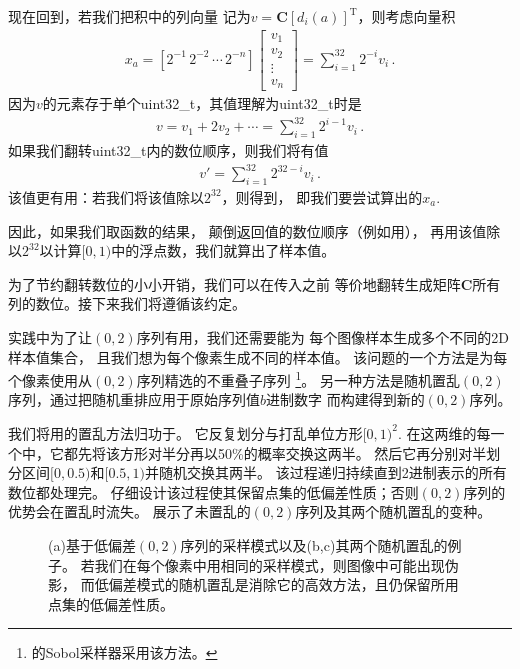 现在回到，若我们把积中的列向量
记为$v={\bm C}[d_i(a)]^{\mathrm{T}}$，则考虑向量积
\begin{align}\label{eq:7.11}
    x_a=[2^{-1}\, 2^{-2}\,\cdots\, 2^{-n}]\left[
        \begin{array}{c}
            v_1    \\
            v_2    \\
            \vdots \\
            v_n
        \end{array}
        \right]=\sum\limits_{i=1}^{32}{2^{-i}v_i}\, .
\end{align}
因为$v$的元素存于单个{\ttfamily uint32\_t}，其值理解为{\ttfamily uint32\_t}时是
\begin{align*}
    v=v_1+2v_2+\cdots=\sum\limits_{i=1}^{32}{2^{i-1}v_i}\, .
\end{align*}
如果我们翻转{\ttfamily uint32\_t}内的数位顺序，则我们将有值
\begin{align*}
    v'=\sum\limits_{i=1}^{32}{2^{32-i}v_i}\, .
\end{align*}
该值更有用：若我们将该值除以$2^{32}$，则得到，
即我们要尝试算出的$x_a$.

因此，如果我们取函数的结果，
颠倒返回值的数位顺序（例如用），
再用该值除以$2^{32}$以计算$[0,1)$中的浮点数，我们就算出了样本值。

为了节约翻转数位的小小开销，我们可以在传入之前
等价地翻转生成矩阵$\bm C$所有列的数位。接下来我们将遵循该约定。

实践中为了让$(0,2)$序列有用，我们还需要能为
每个图像样本生成多个不同的2D样本值集合，
且我们想为每个像素生成不同的样本值。
该问题的一个方法是为每个像素使用从$(0,2)$序列精选的不重叠子序列
\footnote{的Sobol采样器采用该方法。}。
另一种方法是随机置乱$(0,2)$序列，通过把随机重排应用于原始序列值$b$进制数字
而构建得到新的$(0,2)$序列。

我们将用的置乱方法归功于\citet{10.1111/1467-8659.00706}。
它反复划分与打乱单位方形$[0,1)^2$.
在这两维的每一个中，它都先将该方形对半分再以50\%的概率交换这两半。
然后它再分别对半划分区间$[0,0.5)$和$[0.5,1)$并随机交换其两半。
该过程递归持续直到2进制表示的所有数位都处理完。
仔细设计该过程使其保留点集的低偏差性质；否则$(0,2)$序列的优势会在置乱时流失。
展示了未置乱的$(0,2)$序列及其两个随机置乱的变种。
\begin{figure}[htbp]
    \centering
    \quad
    \quad
    \caption{(a)基于低偏差$(0,2)$序列的采样模式以及(b,c)其两个随机置乱的例子。
        若我们在每个像素中用相同的采样模式，则图像中可能出现伪影，
        而低偏差模式的随机置乱是消除它的高效方法，且仍保留所用点集的低偏差性质。}
    \label{fig:7.29}
\end{figure}

